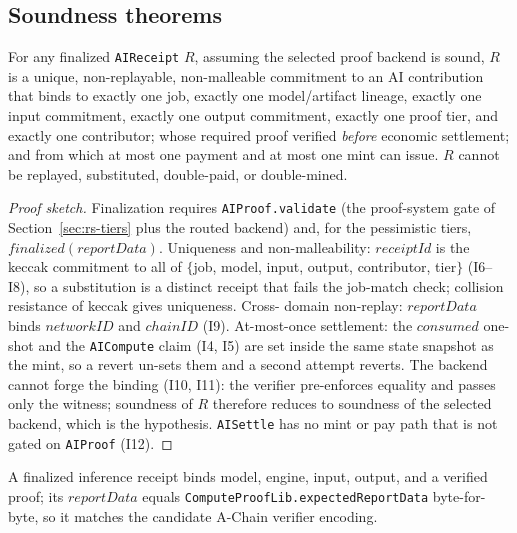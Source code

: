 \subsection{Soundness theorems}
\label{sec:rs-theorems}

\begin{theorem}
\label{thm:receipt-soundness}
For any finalized \texttt{AIReceipt} $R$, assuming the selected proof backend is
sound, $R$ is a unique, non-replayable, non-malleable commitment to an AI
contribution that binds to exactly one job, exactly one model/artifact lineage,
exactly one input commitment, exactly one output commitment, exactly one proof
tier, and exactly one contributor; whose required proof verified \emph{before}
economic settlement; and from which at most one payment and at most one mint can
issue. $R$ cannot be replayed, substituted, double-paid, or double-mined.
\end{theorem}

\begin{proof}[Proof sketch]
Finalization requires \texttt{AIProof.validate} (the proof-system gate of
Section~\ref{sec:rs-tiers} plus the routed backend) and, for the pessimistic tiers,
$\mathit{finalized}(\mathit{reportData})$. Uniqueness and non-malleability:
$\mathit{receiptId}$ is the keccak commitment to all of $\{$job, model, input,
output, contributor, tier$\}$ (I6--I8), so a substitution is a distinct receipt that
fails the job-match check; collision resistance of keccak gives uniqueness. Cross-
domain non-replay: $\mathit{reportData}$ binds $\mathit{networkID}$ and
$\mathit{chainID}$ (I9). At-most-once settlement: the $\mathit{consumed}$ one-shot
and the \texttt{AICompute} claim (I4, I5) are set inside the same state snapshot as
the mint, so a revert un-sets them and a second attempt reverts. The backend cannot
forge the binding (I10, I11): the verifier pre-enforces equality and passes only the
witness; soundness of $R$ therefore reduces to soundness of the selected backend,
which is the hypothesis. \texttt{AISettle} has no mint or pay path that is not gated
on \texttt{AIProof} (I12).
\end{proof}

\begin{corollary}
A finalized inference receipt binds model, engine, input, output, and a verified
proof; its $\mathit{reportData}$ equals \texttt{ComputeProofLib.expectedReportData}
byte-for-byte, so it matches the candidate A-Chain verifier encoding.
\end{corollary}

